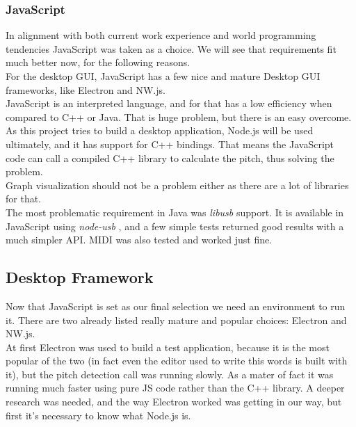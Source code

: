 \subsubsection{JavaScript}
In alignment with both current work experience and world programming tendencies
JavaScript was taken as a choice. We will see that requirements fit much better now,
for the following reasons. \\
For the desktop GUI, JavaScript has a few nice and mature Desktop GUI frameworks,
like Electron and NW.js. \\
JavaScript is an interpreted language, and for that has a low efficiency when
compared to C++ or Java. That is huge problem, but there is an easy overcome. As
this project tries to build a desktop application, Node.js will be used ultimately,
and it has support for C++ bindings. That means the JavaScript code can call a
compiled C++ library to calculate the pitch, thus solving the problem. \\
Graph visualization should not be a problem either as there are a lot of libraries
for that. \\
The most problematic requirement in Java was \textit{libusb} support. It is available
in JavaScript using \textit{node-usb} \cite{node-usb}, and a few simple tests
returned good results with a much simpler API. MIDI was also tested and worked just fine.

\subsection{Desktop Framework}
Now that JavaScript is set as our final selection we need an environment to run
it. There are two already listed really mature and popular choices: Electron and NW.js. \\
At first Electron was used to build a test application, because it is the most popular
of the two (in fact even the editor used to write this words is built with it),
but the pitch detection call was running slowly. As a mater of fact it was running
much faster using pure JS code rather than the C++ library. A deeper research
was needed, and the way Electron worked was getting in our way, but first it's
necessary to know what Node.js is.


